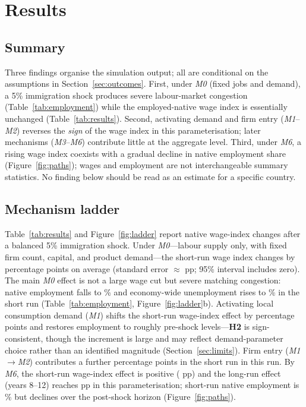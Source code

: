 \documentclass[11pt,a4paper]{article}
\begin{document}
\section{Results}
\label{sec:results}

\subsection{Summary}

Three findings organise the simulation output; all are conditional on the assumptions in Section~\ref{sec:outcomes}.
First, under \emph{M0} (fixed jobs and demand), a 5\% immigration shock produces severe labour-market congestion (Table~\ref{tab:employment}) while the employed-native wage index is essentially unchanged (Table~\ref{tab:results}).
Second, activating demand and firm entry (\emph{M1}--\emph{M2}) reverses the \emph{sign} of the wage index in this parameterisation; later mechanisms (\emph{M3}--\emph{M6}) contribute little at the aggregate level.
Third, under \emph{M6}, a rising wage index coexists with a gradual decline in native employment share (Figure~\ref{fig:paths}); wages and employment are not interchangeable summary statistics.
No finding below should be read as an estimate for a specific country.

\subsection{Mechanism ladder}

Table~\ref{tab:results} and Figure~\ref{fig:ladder} report native wage-index changes after a balanced 5\% immigration shock.
Under \emph{M0}---labour supply only, with fixed firm count, capital, and product demand---the short-run wage index changes by \MZeroShortWage{} percentage points on average (standard error $\approx$\MZeroShortWageSE{} pp; 95\% interval includes zero).
The main \emph{M0} effect is not a large wage cut but severe matching congestion: native employment falls to \MZeroEmpShort{}\% and economy-wide unemployment rises to \MZeroUnempShort{}\% in the short run (Table~\ref{tab:employment}, Figure~\ref{fig:ladder}b).
Activating local consumption demand (\emph{M1}) shifts the short-run wage-index effect by \DemandContrib{} percentage points and restores employment to roughly pre-shock levels---\textbf{H2} is sign-consistent, though the increment is large and may reflect demand-parameter choice rather than an identified magnitude (Section~\ref{sec:limits}).
Firm entry (\emph{M1}$\rightarrow$\emph{M2}) contributes a further \EntryContrib{} percentage points in the short run in this run.
By \emph{M6}, the short-run wage-index effect is positive (\MSixShortWage{} pp) and the long-run effect (years 8--12) reaches \MSixLongWage{} pp in this parameterisation; short-run native employment is \MSixEmpShort{}\% but declines over the post-shock horizon (Figure~\ref{fig:paths}).
\end{document}
